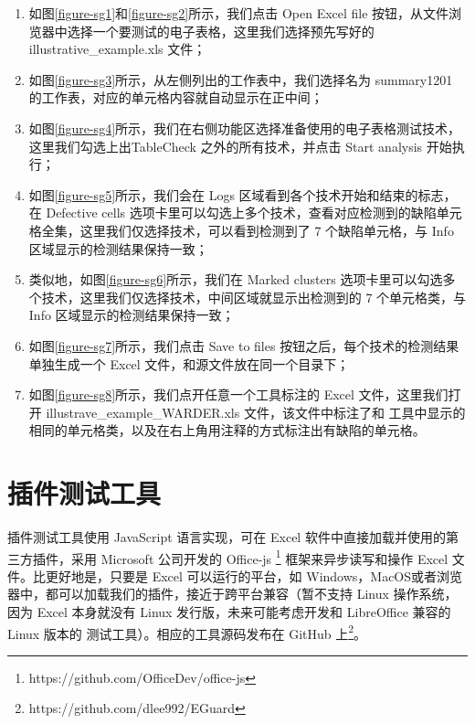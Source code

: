 








\begin{enumerate}
    \item 如图\ref{figure-sg1}和\ref{figure-sg2}所示，我们点击 Open Excel file 按钮，从文件浏览器中选择一个要测试的电子表格，这里我们选择预先写好的 illustrative\_example.xls 文件；
    \item 如图\ref{figure-sg3}所示，从左侧列出的工作表中，我们选择名为 summary1201 的工作表，对应的单元格内容就自动显示在正中间；
    \item 如图\ref{figure-sg4}所示，我们在右侧功能区选择准备使用的电子表格测试技术，这里我们勾选上出TableCheck 之外的所有技术，并点击 Start analysis 开始执行；
    \item 如图\ref{figure-sg5}所示，我们会在 Logs 区域看到各个技术开始和结束的标志，在 Defective cells 选项卡里可以勾选上多个技术，查看对应检测到的缺陷单元格全集，这里我们仅选择\wa 技术，可以看到\wa 检测到了 7 个缺陷单元格，与 Info 区域显示的检测结果保持一致；
    \item 类似地，如图\ref{figure-sg6}所示，我们在 Marked clusters 选项卡里可以勾选多个技术，这里我们仅选择\wa 技术，中间区域就显示出\wa 检测到的 7 个单元格类，与 Info 区域显示的检测结果保持一致；
    \item 如图\ref{figure-sg7}所示，我们点击 Save to files 按钮之后，每个技术的检测结果单独生成一个 Excel 文件，和源文件放在同一个目录下；
    \item 如图\ref{figure-sg8}所示，我们点开任意一个工具标注的 Excel 文件，这里我们打开 illustrave\_example\_WARDER.xls 文件，该文件中标注了和 \sg 工具中显示的相同的单元格类，以及在右上角用注释的方式标注出有缺陷的单元格。
\end{enumerate}


\section{\eg 插件测试工具}

\eg 插件测试工具使用 JavaScript 语言实现，可在 Excel 软件中直接加载并使用的第三方插件，采用 Microsoft 公司开发的 Office-js \footnote{https://github.com/OfficeDev/office-js} 框架来异步读写和操作 Excel 文件。比\sg 更好地是，只要是 Excel 可以运行的平台，如 Windows，MacOS或者浏览器中，都可以加载我们的\eg 插件，接近于跨平台兼容（暂不支持 Linux 操作系统，因为 Excel 本身就没有 Linux 发行版，未来可能考虑开发和 LibreOffice 兼容的 Linux 版本的 \wa 测试工具）。相应的工具源码发布在 GitHub 上\footnote{https://github.com/dlee992/EGuard}。

